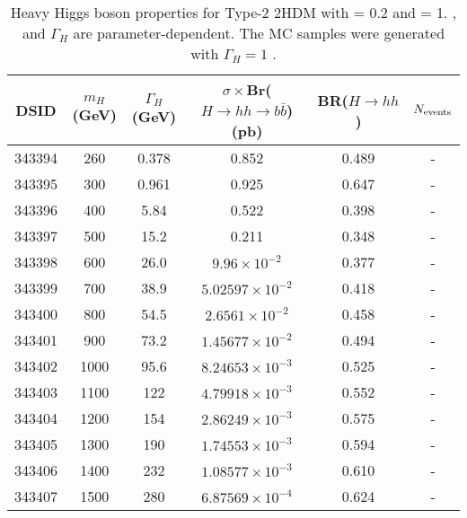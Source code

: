\begin{table}[h]
\begin{center}
\begin{tabular}{c | c | c | c | c | c}\hline
DSID & $m_H$ (GeV) & $\Gamma_H$ (GeV) & $\sigma\times$Br($H\to hh \to b\bar{b}$) (pb) &  BR($H\to hh$) & $N_{\rm{events}}$\\\hline
343394 & 260 & 0.378 & 0.852 				& 0.489 &  -  \\
343395 & 300 & 0.961 & 0.925 				& 0.647 &  - \\
343396 & 400 & 5.84 & 0.522 				& 0.398 &  - \\
343397 & 500 & 15.2 & 0.211 				& 0.348 &  - \\
343398 & 600 & 26.0 & $9.96\times10^{-2}$ 	& 0.377 &  - \\
343399 & 700 & 38.9 &$ 5.02597\times10^{-2}$ & 0.418 &  - \\
343400 & 800 & 54.5 & $2.6561\times10^{-2}$ & 0.458 &  - \\
343401 & 900 & 73.2 & $1.45677\times10^{-2}$ & 0.494 &  - \\
343402 & 1000 & 95.6 & $8.24653\times10^{-3}$ & 0.525 &  - \\
343403 & 1100 & 122 & $4.79918\times10^{-3}$ & 0.552 &  - \\
343404 & 1200 & 154 & $2.86249\times10^{-3}$ & 0.575 &  - \\
343405 & 1300 & 190 & $1.74553\times10^{-3}$ & 0.594 &  - \\
343406 & 1400 & 232 & $1.08577\times10^{-3}$ & 0.610 &  - \\
343407 & 1500 & 280 & $6.87569\times10^{-4}$ & 0.624 &  - \\
\hline
\end{tabular}
\caption{Heavy Higgs boson properties for Type-2 2HDM with \cba = 0.2 and \tanb = 1. \BrHhh, \Brhbb and $\Gamma_H$ are parameter-dependent. The MC samples were generated with $\Gamma_H = 1$ \GeV.}
\label{tab:signal_2hdm_xsec}
\end{center}
\end{table}
 

